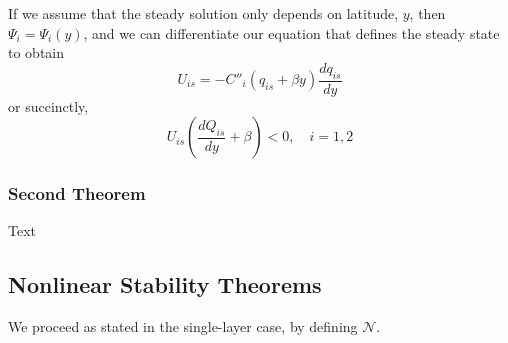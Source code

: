 \documentclass[12pt]{article}
\begin{document}
{{{            If we assume that the steady solution only depends on latitude, $y$, then $\Psi_i = \Psi_i(y)$, and we can differentiate our equation that defines the steady state to obtain
            $$
            U_{is} = -C''_i(q_{is} + \beta y) \frac{dq_{is}}{dy}
            $$
            or succinctly,
            $$
            U_{is} \left(\frac{d Q_{is}}{dy} + \beta \right) < 0, \quad i=1,2
            $$
        }
        \subsubsection{Second Theorem}
            Text
    }

    \subsection{Nonlinear Stability Theorems}{
        We proceed as stated in the single-layer case, by defining $\mathcal{N}$.

}}
\end{document}
